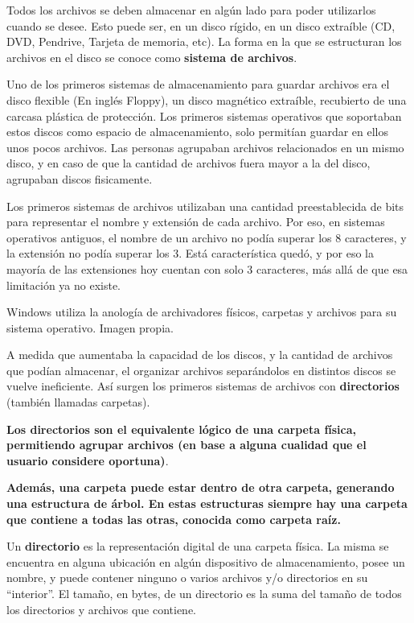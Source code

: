 Todos los archivos se deben almacenar en algún lado para poder utilizarlos
cuando se desee. Esto puede ser, en un disco rígido, en un disco extraíble
(CD, DVD, Pendrive, Tarjeta de memoria, etc). La forma en la que se estructuran
los archivos en el disco se conoce como \textbf{sistema de archivos}.

Uno de los primeros sistemas de almacenamiento para guardar archivos era el
disco flexible (En inglés Floppy), un disco magnético extraíble, recubierto de
una carcasa plástica de protección. Los primeros sistemas operativos que soportaban
estos discos como espacio de almacenamiento, solo permitían guardar en ellos unos
pocos archivos. Las personas agrupaban archivos relacionados en un mismo disco,
y en caso de que la cantidad de archivos fuera mayor a la del disco, agrupaban
discos fisicamente.

\begin{knowwhat}
Los primeros sistemas de archivos utilizaban una cantidad preestablecida de
bits para representar el nombre y extensión de cada archivo. Por eso,
en sistemas operativos antiguos, el nombre de un archivo no podía superar los
8 caracteres, y la extensión no podía superar los 3. Está característica quedó,
y por eso la mayoría de las extensiones hoy cuentan con solo 3 caracteres,
más allá de que esa limitación ya no existe.
\end{knowwhat}

{Windows utiliza la anología de archivadores físicos, carpetas y archivos
para su sistema operativo.}
{Imagen propia.}

A medida que aumentaba la capacidad de los discos, y la cantidad de archivos
que podían almacenar, el organizar archivos separándolos en distintos discos
se vuelve ineficiente. Así surgen los primeros sistemas de archivos con
\textbf{directorios} (también llamadas carpetas).

\textbf{Los directorios son el equivalente lógico de una carpeta física,
permitiendo agrupar archivos (en base a alguna cualidad que el usuario
considere oportuna)}.

\textbf{Además, una carpeta puede estar dentro de otra carpeta, generando una
estructura de árbol. En estas estructuras siempre hay una carpeta que contiene
a todas las otras, conocida como carpeta raíz.}

\begin{definition}
    Un \textbf{directorio} es la representación digital de una carpeta física.
    La misma se encuentra en alguna ubicación en algún dispositivo de
    almacenamiento, posee un nombre, y puede contener ninguno o varios
    archivos y/o directorios en su ``interior''. El tamaño, en bytes, de un
    directorio es la suma del tamaño de todos los directorios y archivos que
    contiene.\autocite[part. IV]{gookin_2005}
\end{definition}

